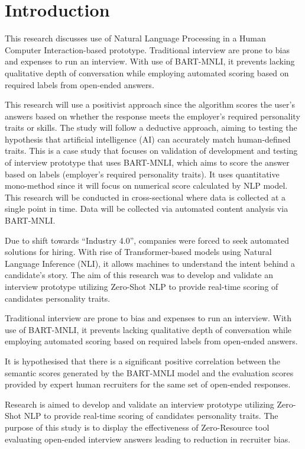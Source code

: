 \section{Introduction}
\label{sec:Int}
\par This research discusses use of Natural Language Processing in a Human Computer Interaction-based prototype. Traditional interview are prone to bias and expenses to run an interview. With use of BART-MNLI, it prevents lacking qualitative depth of conversation while employing automated scoring based on required labels from open-ended answers.
\par This research will use a positivist approach since the algorithm scores the user’s answers based on whether the response meets the employer’s required personality traits or skills. The study will follow a deductive approach, aiming to testing the hypothesis that artificial intelligence (AI) can accurately match human-defined traits. This is a case study that focuses on validation of development and testing of interview prototype that uses BART-MNLI, which aims to score the answer based on labels (employer’s required personality traits). It uses quantitative mono-method since it will focus on numerical score calculated by NLP model. This research will be conducted in cross-sectional where data is collected at a single point in time. Data will be collected via automated content analysis via BART-MNLI.
\par Due to shift towards “Industry 4.0”, companies were forced to seek automated solutions for hiring. With rise of Transformer-based models using Natural Language Inference (NLI), it allows machines to understand the intent behind a candidate's story. The aim of this research was to develop and validate an interview prototype utilizing Zero-Shot NLP to provide real-time scoring of candidates personality traits. 
\par Traditional interview are prone to bias and expenses to run an interview. With use of BART-MNLI, it prevents lacking qualitative depth of conversation while employing automated scoring based on required labels from open-ended answers. 
\par It is hypothesised that there is a significant positive correlation between the semantic scores generated by the BART-MNLI model and the evaluation scores provided by expert human recruiters for the same set of open-ended responses.
\par Research is aimed to develop and validate an interview prototype utilizing Zero-Shot NLP to provide real-time scoring of candidates personality traits. The purpose of this study is to display the effectiveness of Zero-Resource tool evaluating open-ended interview answers leading to reduction in recruiter bias. 